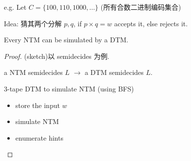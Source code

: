 e.g. Let $C=\{ 100, 110, 1000, \dots \}$ (所有合数二进制编码集合) 

Idea: 猜其两个分解 $p,q$, if $p\times q=w$ accepts it, else rejects it. 

\begin{theorem}
    Every NTM can be simulated by a DTM. 
\end{theorem}
\begin{proof}(sketch)以 semidecides 为例. 

    a NTM semidecides $L$ $\to$ a DTM semidecides $L$. 

    3-tape DTM to simulate NTM (using BFS) 
    \begin{itemize}
        \item store the input $w$
        \item simulate NTM
        \item enumerate hints
    \end{itemize}
\end{proof}